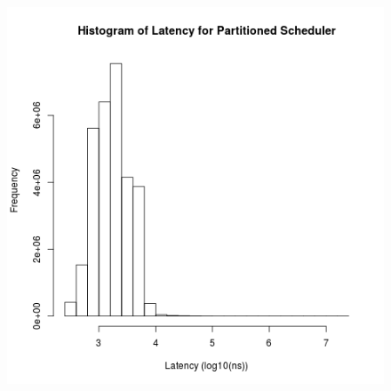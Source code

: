 
\begin{figure}
\center
\includegraphics[width=\textwidth]{partitioned_latency_hist.png}
\caption{\label{partitioned_latency}}
\end{figure}

\clearpage

